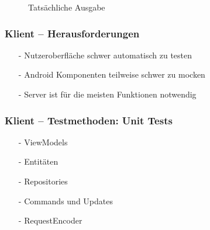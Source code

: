 \documentclass[aspectratio=1610]{beamer}
\begin{document}
\begin{frame}[plain]
\begin{minipage}{0.45\textwidth}
{\begin{figure}
                    \caption{Tatsächliche Ausgabe}
                \end{figure}
            }
        \end{minipage}
    \end{frame}


	\begin{frame}[plain]
        \frametitle{\textbf{Klient} -- Herausforderungen}

        \begin{itemize}
          \item[-] Nutzeroberfläche schwer automatisch zu testen
          \item[-] Android Komponenten teilweise schwer zu mocken
          \item[-] Server ist für die meisten Funktionen notwendig
        \end{itemize}
  \end{frame}

\begin{frame}[plain]
        \frametitle{\textbf{Klient} -- Testmethoden: Unit Tests}

        \begin{itemize}
          \item[-] ViewModels
          \item[-] Entitäten
          \item[-] Repositories
          \item[-] Commands und Updates
          \item[-] RequestEncoder
        \end{itemize}
  \end{frame}
\end{document}
